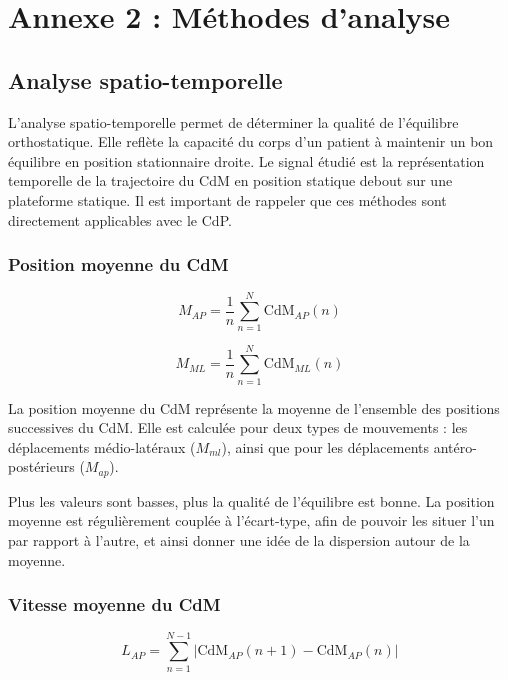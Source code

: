 \newpage
\section{Annexe 2 : Méthodes d'analyse}
\label{annexe:2}

\subsection{Analyse spatio-temporelle}

L'analyse spatio-temporelle permet de déterminer la qualité de l'équilibre orthostatique. 
Elle reflète la capacité du corps d'un patient à maintenir un bon équilibre en position stationnaire droite. 
Le signal étudié est la représentation temporelle de la trajectoire du CdM en position statique debout sur une plateforme statique. 
Il est important de rappeler que ces méthodes sont directement applicables avec le CdP.

\subsubsection{Position moyenne du CdM}

\begin{equation}
  M_{AP} = \frac{1}{n} \sum_{n=1}^N \mbox{CdM}_{AP}(n) 
  \label{eq:M_AP}
\end{equation}

\begin{equation}
  M_{ML} = \frac{1}{n} \sum_{n=1}^N \mbox{CdM}_{ML}(n) 
  \label{eq:M_ML}
\end{equation}

La position moyenne du CdM représente la moyenne de l'ensemble des positions successives du CdM. 
Elle est calculée pour deux types de mouvements : les déplacements médio-latéraux ($M_{ml}$), ainsi que pour les déplacements antéro-postérieurs ($M_{ap}$).

Plus les valeurs sont basses, plus la qualité de l'équilibre est bonne.
La position moyenne est régulièrement couplée à l'écart-type, afin de pouvoir les situer l'un par rapport à l'autre, et ainsi donner une idée de la dispersion autour de la moyenne.

\subsubsection{Vitesse moyenne du CdM}

\begin{equation}
  L_{AP} = \sum_{n=1}^{N-1} \left| \mbox{CdM}_{AP}(n+1) - \mbox{CdM}_{AP}(n) \right|
  \label{eq:L_AP}
\end{equation}

